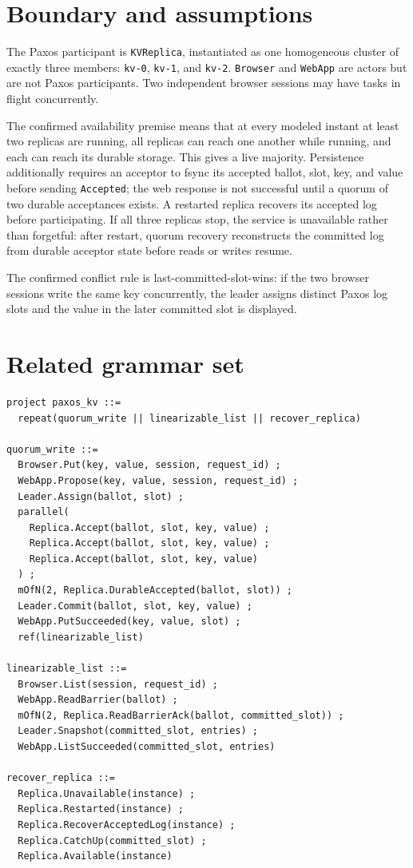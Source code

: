 \hypertarget{boundary-and-assumptions}{%
\section{Boundary and assumptions}\label{boundary-and-assumptions}}

The Paxos participant is \texttt{KVReplica}, instantiated as one
homogeneous cluster of exactly three members: \texttt{kv-0},
\texttt{kv-1}, and \texttt{kv-2}. \texttt{Browser} and \texttt{WebApp}
are actors but are not Paxos participants. Two independent browser
sessions may have tasks in flight concurrently.

The confirmed availability premise means that at every modeled instant
at least two replicas are running, all replicas can reach one another
while running, and each can reach its durable storage. This gives a live
majority. Persistence additionally requires an acceptor to fsync its
accepted ballot, slot, key, and value before sending \texttt{Accepted};
the web response is not successful until a quorum of two durable
acceptances exists. A restarted replica recovers its accepted log before
participating. If all three replicas stop, the service is unavailable
rather than forgetful: after restart, quorum recovery reconstructs the
committed log from durable acceptor state before reads or writes resume.

The confirmed conflict rule is last-committed-slot-wins: if the two
browser sessions write the same key concurrently, the leader assigns
distinct Paxos log slots and the value in the later committed slot is
displayed.

\hypertarget{related-grammar-set}{%
\section{Related grammar set}\label{related-grammar-set}}

\begin{verbatim}
project paxos_kv ::=
  repeat(quorum_write || linearizable_list || recover_replica)

quorum_write ::=
  Browser.Put(key, value, session, request_id) ;
  WebApp.Propose(key, value, session, request_id) ;
  Leader.Assign(ballot, slot) ;
  parallel(
    Replica.Accept(ballot, slot, key, value) ;
    Replica.Accept(ballot, slot, key, value) ;
    Replica.Accept(ballot, slot, key, value)
  ) ;
  mOfN(2, Replica.DurableAccepted(ballot, slot)) ;
  Leader.Commit(ballot, slot, key, value) ;
  WebApp.PutSucceeded(key, value, slot) ;
  ref(linearizable_list)

linearizable_list ::=
  Browser.List(session, request_id) ;
  WebApp.ReadBarrier(ballot) ;
  mOfN(2, Replica.ReadBarrierAck(ballot, committed_slot)) ;
  Leader.Snapshot(committed_slot, entries) ;
  WebApp.ListSucceeded(committed_slot, entries)

recover_replica ::=
  Replica.Unavailable(instance) ;
  Replica.Restarted(instance) ;
  Replica.RecoverAcceptedLog(instance) ;
  Replica.CatchUp(committed_slot) ;
  Replica.Available(instance)
\end{verbatim}


